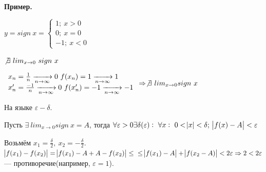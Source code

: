 \documentclass{article}
\begin{document}
  \textbf{Пример.}
  
  \(y=sign\ x=\begin{cases}1;\ x>0\\ 0;\ x=0\\ -1;\ x<0\end{cases}\)

  \(\not \exists\ lim_{x \rightarrow 0}\ sign\ x\)

  \(
  \begin{array}{l}
    x_n = \frac{1}{n} \xrightarrow[n \rightarrow \infty]{} 0\ f(x_n)=1 \xrightarrow[n \rightarrow \infty]{} 1\\
    x_n' = \frac{-1}{n} \xrightarrow[n \rightarrow \infty]{} 0\ f(x_n')=-1 \xrightarrow[n \rightarrow \infty]{} -1
  \end{array} \Rightarrow
  \not\exists\ lim_{x \rightarrow 0} sign\ x
  \)

  На языке \(\varepsilon - \delta.\)

  Пусть \(\exists\ lim_{x \rightarrow 0} sign\ x = A\), тогда \(\forall \varepsilon > 0 \exists \delta(\varepsilon):\ \forall x:\ 0 < \abs{x} < \delta;\ \abs{f(x)-A}<\varepsilon\)

  Возьмём \(x_1 = \frac{\delta}{2},\ x_2 = -\frac{\delta}{2}\). \(\abs{f(x_1)-f(x_2)} = \abs{f(x_1)-A+A-f(x_2)} \leq\\ \leq \abs{f(x_1)-A}+\abs{f(x_2-A)} < 2 \varepsilon \Rightarrow 2 < 2\varepsilon\) --- противоречие(например, \(\varepsilon = 1\)).
\end{document}

